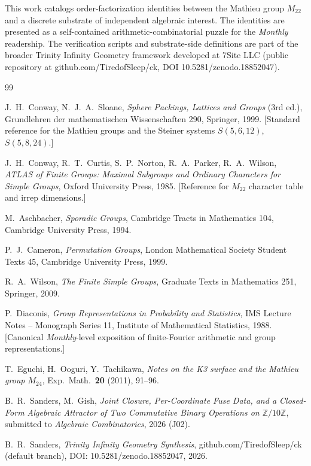 \documentclass[11pt,reqno]{amsart}
\theoremstyle{plain}
\theoremstyle{definition}
\theoremstyle{remark}
\newcommand{\Z}{\mathbb{Z}}
\newcommand{\Mtwentytwo}{M_{22}}
\begin{document}
This work catalogs order-factorization identities between the Mathieu
group $\Mtwentytwo$ and a discrete substrate of independent algebraic
interest. The identities are presented as a self-contained
arithmetic-combinatorial puzzle for the \emph{Monthly} readership.
The verification scripts and substrate-side definitions are part of
the broader Trinity Infinity Geometry framework developed at 7Site
LLC (public repository at github.com/TiredofSleep/ck, DOI
10.5281/zenodo.18852047).

\begin{thebibliography}{99}

 J.~H.~Conway, N.~J.~A.~Sloane,
\emph{Sphere Packings, Lattices and Groups} (3rd ed.),
Grundlehren der mathematischen Wissenschaften 290, Springer, 1999.
[Standard reference for the Mathieu groups and the Steiner systems
$S(5, 6, 12)$, $S(5, 8, 24)$.]

 J.~H.~Conway, R.~T.~Curtis, S.~P.~Norton,
R.~A.~Parker, R.~A.~Wilson,
\emph{ATLAS of Finite Groups: Maximal Subgroups and Ordinary
Characters for Simple Groups},
Oxford University Press, 1985.
[Reference for $\Mtwentytwo$ character table and irrep dimensions.]

 M.~Aschbacher,
\emph{Sporadic Groups},
Cambridge Tracts in Mathematics 104, Cambridge University Press, 1994.

 P.~J.~Cameron,
\emph{Permutation Groups},
London Mathematical Society Student Texts 45, Cambridge University
Press, 1999.

 R.~A.~Wilson,
\emph{The Finite Simple Groups},
Graduate Texts in Mathematics 251, Springer, 2009.

 P.~Diaconis,
\emph{Group Representations in Probability and Statistics},
IMS Lecture Notes -- Monograph Series 11, Institute of Mathematical
Statistics, 1988.
[Canonical \emph{Monthly}-level exposition of finite-Fourier
arithmetic and group representations.]

 T.~Eguchi, H.~Ooguri, Y.~Tachikawa,
\emph{Notes on the K3 surface and the Mathieu group $M_{24}$},
Exp.~Math.~\textbf{20} (2011), 91--96.

 B.~R.~Sanders, M.~Gish,
\emph{Joint Closure, Per-Coordinate Fuse Data, and a Closed-Form
Algebraic Attractor of Two Commutative Binary Operations on
$\Z/10\Z$}, submitted to \emph{Algebraic Combinatorics}, 2026 (J02).

 B.~R.~Sanders,
\emph{Trinity Infinity Geometry Synthesis},
github.com/TiredofSleep/ck (default branch),
DOI: 10.5281/zenodo.18852047, 2026.

\end{thebibliography}
\end{document}

